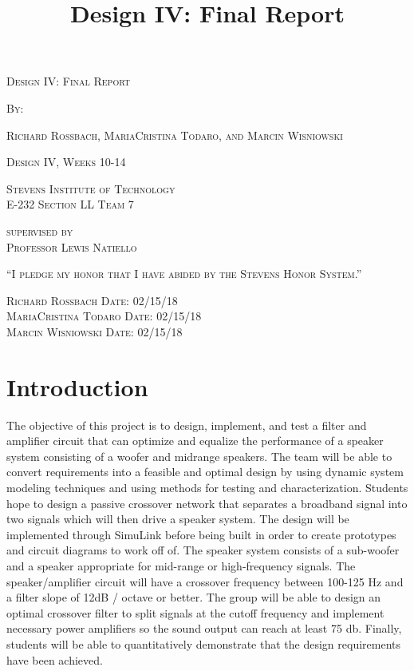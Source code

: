 \documentclass{article}
\begin{document}
\title{Design IV: Final Report}
\begin{titlepage}
    \centering
	{\scshape\LARGE Design IV: Final Report \par}
	\vspace{.5cm}
    {\scshape By:\par}
	{\scshape Richard Rossbach, MariaCristina Todaro, and Marcin Wisniowski \par}
	\vfill
	{\scshape Design IV, Weeks 10-14\par}
	\vspace{.5cm}
	{\scshape Stevens Institute of Technology\\E-232 Section LL Team 7\par}
	\vspace{.5cm}
	{\scshape supervised by\\Professor Lewis Natiello\par}
    \vfill
	{\scshape“I pledge my honor that I have abided by the Stevens Honor System.”\par}
	\vspace{.5cm}
	{\scshape Richard Rossbach \hfill Date: 02/15/18\\MariaCristina	Todaro \hfill Date: 02/15/18\\Marcin Wisniowski \hfill Date: 02/15/18\\}
	\vspace{3cm}
\end{titlepage}

\tableofcontents
\newpage

\section{Introduction}
\indent The objective of this project is to design, implement, and test a filter and amplifier circuit that can optimize and equalize the performance of a speaker system consisting of a woofer and  midrange speakers. The team will be able to convert requirements into a feasible and optimal design by using  dynamic system modeling techniques and using methods for testing and characterization. Students hope to design a passive crossover network that separates a broadband signal into two signals which will then drive a speaker system. The design will be implemented through SimuLink before being built in order to create prototypes and circuit diagrams to work off of. The speaker system consists of a sub-woofer and a speaker appropriate for mid-range or high-frequency signals. The speaker/amplifier circuit will have a crossover frequency between 100-125 Hz and a filter slope of 12dB / octave or better. The group will be able to design an optimal crossover filter to split signals at the cutoff frequency and implement necessary power amplifiers so the sound output  can reach at least 75 db. Finally, students will be able to quantitatively demonstrate that the design requirements have been achieved.
\end{document}
